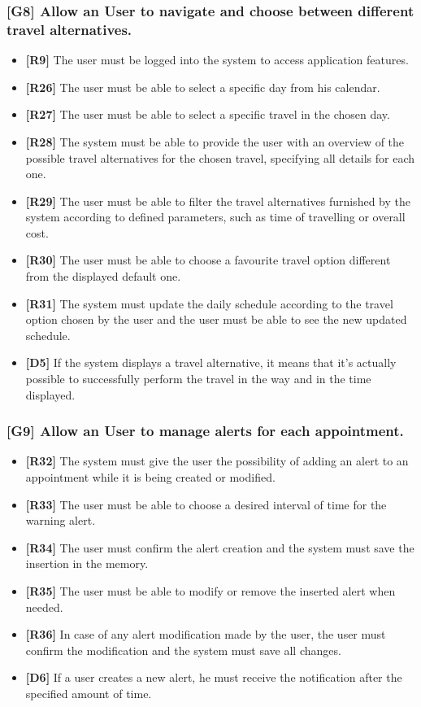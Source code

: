 \subsubsection{[G8] Allow an User to navigate and choose between different travel alternatives.}
	\begin{itemize}
		\item \textbf{[R9]} The user must be logged into the system to access application features.
		\item \textbf{[R26]} The user must be able to select a specific day from his calendar.
		\item \textbf{[R27]} The user must be able to select a specific travel in the chosen day.
		\item \textbf{[R28]} The system must be able to provide the user with an overview of the possible travel alternatives for the chosen travel, specifying all details for each one.
		\item \textbf{[R29]} The user must be able to filter the travel alternatives furnished by the system according to defined parameters, such as time of travelling or overall cost.
		\item \textbf{[R30]} The user must be able to choose a favourite travel option different from the displayed default one.
		\item \textbf{[R31]} The system must update the daily schedule according to the travel option chosen by the user and the user must be able to see the new updated schedule.
		\item \textbf{[D5]} If the system displays a travel alternative, it means that it’s actually possible to successfully perform the travel in the way and in the time displayed.
		
	\end{itemize}
\subsubsection{[G9] Allow an User to manage alerts for each appointment.}
	\begin{itemize}
		\item \textbf{[R32]} The system must give the user the possibility of adding an alert to an appointment while it is being created or modified.
		\item \textbf{[R33]} The user must be able to choose a desired interval of time for the warning alert.
		\item \textbf{[R34]} The user must confirm the alert creation and the system must save the insertion in the memory.
		\item \textbf{[R35]} The user must be able to modify or remove the inserted alert when needed.
		\item \textbf{[R36]} In case of any alert modification made by the user, the user must confirm the modification and the system must save all changes.
		\item \textbf{[D6]} If a user creates a new alert, he must receive the notification after the specified amount of time.
		
	\end{itemize}
